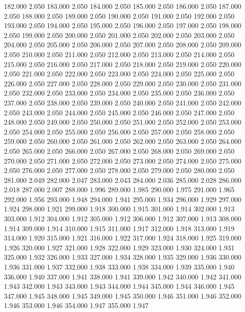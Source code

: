 182.000 2.050 
183.000 2.050 
184.000 2.050 
185.000 2.050 
186.000 2.050 
187.000 2.050 
188.000 2.050 
189.000 2.050 
190.000 2.050 
191.000 2.050 
192.000 2.050 
193.000 2.050 
194.000 2.050 
195.000 2.050 
196.000 2.050 
197.000 2.050 
198.000 2.050 
199.000 2.050 
200.000 2.050 
201.000 2.050 
202.000 2.050 
203.000 2.050 
204.000 2.050 
205.000 2.050 
206.000 2.050 
207.000 2.050 
208.000 2.050 
209.000 2.050 
210.000 2.050 
211.000 2.050 
212.000 2.050 
213.000 2.050 
214.000 2.050 
215.000 2.050 
216.000 2.050 
217.000 2.050 
218.000 2.050 
219.000 2.050 
220.000 2.050 
221.000 2.050 
222.000 2.050 
223.000 2.050 
224.000 2.050 
225.000 2.050 
226.000 2.050 
227.000 2.050 
228.000 2.050 
229.000 2.050 
230.000 2.050 
231.000 2.050 
232.000 2.050 
233.000 2.050 
234.000 2.050 
235.000 2.050 
236.000 2.050 
237.000 2.050 
238.000 2.050 
239.000 2.050 
240.000 2.050 
241.000 2.050 
242.000 2.050 
243.000 2.050 
244.000 2.050 
245.000 2.050 
246.000 2.050 
247.000 2.050 
248.000 2.050 
249.000 2.050 
250.000 2.050 
251.000 2.050 
252.000 2.050 
253.000 2.050 
254.000 2.050 
255.000 2.050 
256.000 2.050 
257.000 2.050 
258.000 2.050 
259.000 2.050 
260.000 2.050 
261.000 2.050 
262.000 2.050 
263.000 2.050 
264.000 2.050 
265.000 2.050 
266.000 2.050 
267.000 2.050 
268.000 2.050 
269.000 2.050 
270.000 2.050 
271.000 2.050 
272.000 2.050 
273.000 2.050 
274.000 2.050 
275.000 2.050 
276.000 2.050 
277.000 2.050 
278.000 2.050 
279.000 2.050 
280.000 2.050 
281.000 2.049 
282.000 2.047 
283.000 2.043 
284.000 2.036 
285.000 2.028 
286.000 2.018 
287.000 2.007 
288.000 1.996 
289.000 1.985 
290.000 1.975 
291.000 1.965 
292.000 1.956 
293.000 1.948 
294.000 1.941 
295.000 1.934 
296.000 1.929 
297.000 1.924 
298.000 1.921 
299.000 1.918 
300.000 1.915 
301.000 1.914 
302.000 1.913 
303.000 1.912 
304.000 1.912 
305.000 1.912 
306.000 1.912 
307.000 1.913 
308.000 1.914 
309.000 1.914 
310.000 1.915 
311.000 1.917 
312.000 1.918 
313.000 1.919 
314.000 1.920 
315.000 1.921 
316.000 1.922 
317.000 1.924 
318.000 1.925 
319.000 1.926 
320.000 1.927 
321.000 1.928 
322.000 1.929 
323.000 1.930 
324.000 1.931 
325.000 1.932 
326.000 1.933 
327.000 1.934 
328.000 1.935 
329.000 1.936 
330.000 1.936 
331.000 1.937 
332.000 1.938 
333.000 1.938 
334.000 1.939 
335.000 1.940 
336.000 1.940 
337.000 1.941 
338.000 1.941 
339.000 1.942 
340.000 1.942 
341.000 1.943 
342.000 1.943 
343.000 1.943 
344.000 1.944 
345.000 1.944 
346.000 1.945 
347.000 1.945 
348.000 1.945 
349.000 1.945 
350.000 1.946 
351.000 1.946 
352.000 1.946 
353.000 1.946 
354.000 1.947 
355.000 1.947 
